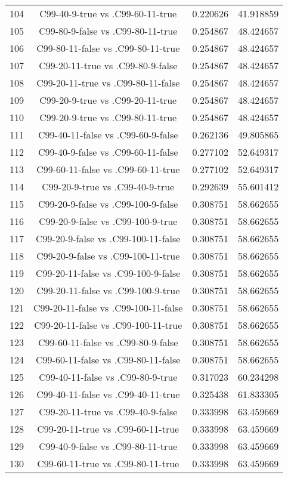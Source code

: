 \documentclass[a4paper,10pt]{article}
\begin{document}
\begin{landscape}
\begin{table}[!htp]
\begin{tabular}{cccc}
104&C99-40-9-true vs .C99-60-11-true&0.220626&41.918859\\
105&C99-80-9-false vs .C99-80-11-true&0.254867&48.424657\\
106&C99-80-11-false vs .C99-80-11-true&0.254867&48.424657\\
107&C99-20-11-true vs .C99-80-9-false&0.254867&48.424657\\
108&C99-20-11-true vs .C99-80-11-false&0.254867&48.424657\\
109&C99-20-9-true vs .C99-20-11-true&0.254867&48.424657\\
110&C99-20-9-true vs .C99-80-11-true&0.254867&48.424657\\
111&C99-40-11-false vs .C99-60-9-false&0.262136&49.805865\\
112&C99-40-9-false vs .C99-60-11-false&0.277102&52.649317\\
113&C99-60-11-false vs .C99-60-11-true&0.277102&52.649317\\
114&C99-20-9-true vs .C99-40-9-true&0.292639&55.601412\\
115&C99-20-9-false vs .C99-100-9-false&0.308751&58.662655\\
116&C99-20-9-false vs .C99-100-9-true&0.308751&58.662655\\
117&C99-20-9-false vs .C99-100-11-false&0.308751&58.662655\\
118&C99-20-9-false vs .C99-100-11-true&0.308751&58.662655\\
119&C99-20-11-false vs .C99-100-9-false&0.308751&58.662655\\
120&C99-20-11-false vs .C99-100-9-true&0.308751&58.662655\\
121&C99-20-11-false vs .C99-100-11-false&0.308751&58.662655\\
122&C99-20-11-false vs .C99-100-11-true&0.308751&58.662655\\
123&C99-60-11-false vs .C99-80-9-false&0.308751&58.662655\\
124&C99-60-11-false vs .C99-80-11-false&0.308751&58.662655\\
125&C99-40-11-false vs .C99-80-9-true&0.317023&60.234298\\
126&C99-40-11-false vs .C99-40-11-true&0.325438&61.833305\\
127&C99-20-11-true vs .C99-40-9-false&0.333998&63.459669\\
128&C99-20-11-true vs .C99-60-11-true&0.333998&63.459669\\
129&C99-40-9-false vs .C99-80-11-true&0.333998&63.459669\\
130&C99-60-11-true vs .C99-80-11-true&0.333998&63.459669\\

\end{tabular}
\end{table}
\end{landscape}
\end{document}
